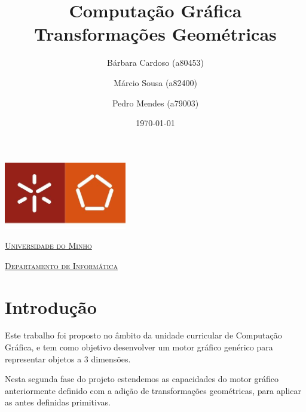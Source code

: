 \documentclass[a4paper]{article}
\begin{document}
\title{Computação Gráfica\\ Transformações Geométricas}
\author{Bárbara Cardoso (a80453) \and Márcio Sousa (a82400) \and Pedro Mendes (a79003)}
\date{\today}

\begin{titlepage}

    \thispagestyle{empty}
    \begin{center}
        \begin{minipage}{0.75\linewidth}
            \centering
            \includegraphics[width=0.4\textwidth]{eng.jpeg}\par\vspace{1cm}
            \vspace{1.5cm}
            \href{https://www.uminho.pt/PT}{\scshape\LARGE Universidade do Minho} \par
            \vspace{1cm}
            \href{https://www.di.uminho.pt/}{\scshape\Large Departamento de Informática} \par
            \vspace{1.5cm}

            \maketitle
        \end{minipage}
    \end{center}

\end{titlepage}

\tableofcontents

\pagebreak

\section{Introdução}
Este trabalho foi proposto no âmbito da unidade curricular de Computação Gráfica, e tem como objetivo desenvolver um motor gráfico genérico para representar objetos a 3 dimensões.

Nesta segunda fase do projeto estendemos as capacidades do motor gráfico anteriormente definido com a adição de transformações geométricas, para aplicar as antes definidas primitivas.
\end{document}
